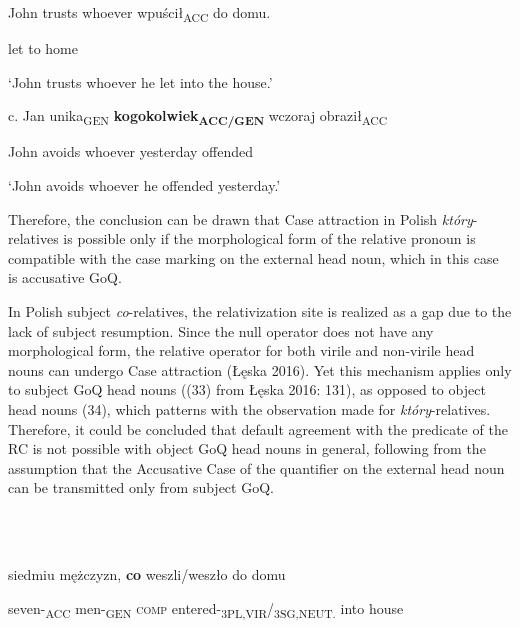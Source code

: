 \documentclass[output=paper]{langsci/langscibook}
\begin{document}
     John   trusts     whoever                     wpuścił\textsubscript{ACC}   do   domu.

    let     to   home

    ‘John trusts whoever he let into the house.’

  c.   Jan   unika\textsubscript{GEN}   \textbf{kogokolwiek\textsubscript{ACC/GEN}} wczoraj   obraził\textsubscript{ACC}

      John   avoids   whoever       yesterday   offended

    ‘John avoids whoever he offended yesterday.’

Therefore, the conclusion can be drawn that Case attraction in Polish \textit{który}{}-relatives is possible only if the morphological form of the relative pronoun is compatible with the case marking on the external head noun, which in this case is accusative GoQ. 

In Polish subject \textit{co}{}-relatives, the relativization site is realized as a gap due to the lack of subject resumption. Since the null operator does not have any morphological form, the relative operator for both virile and non-virile head nouns can undergo Case attraction (Łęska 2016). Yet this mechanism applies only to subject GoQ head nouns ((33) from Łęska 2016: 131), as opposed to object head nouns (34), which patterns with the observation made for \textit{który}{}-relatives. Therefore, it could be concluded that default agreement with the predicate of the RC is not possible with object GoQ head nouns in general, following from the assumption that the Accusative Case of the quantifier on the external head noun can be transmitted only from subject GoQ.

\ea%
    \label{ex:key:33}
    \gll\\
        \\
    \glt
    \z

           siedmiu   mężczyzn,   \textbf{co}   weszli/weszło     do   domu

  seven-\textsubscript{ACC}   men-\textsubscript{GEN}   \textsc{comp}   entered-\textsubscript{3PL,VIR}/\textsubscript{3SG,NEUT.} into   house 

 

\ea%
    \label{ex:key:34}
    \gll\\
        \\
    \glt
    \z
\end{document}
